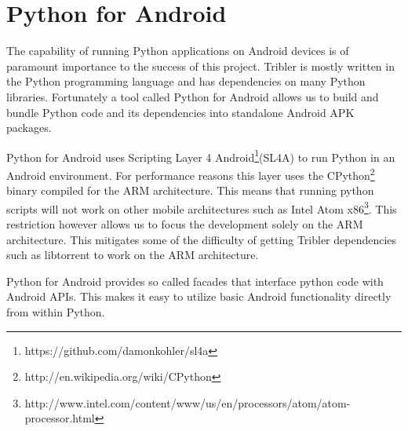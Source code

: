 \section{Python for Android}
	\label{sec:p4a}
	The capability of running Python applications on Android devices is of paramount importance to the success of this project. Tribler is mostly written in the Python programming language and has dependencies on many Python libraries. Fortunately a tool called Python for Android allows us to build and bundle Python code and its dependencies into standalone Android APK packages.

	Python for Android uses Scripting Layer 4 Android\footnote{https://github.com/damonkohler/sl4a}(SL4A) to run Python in an Android environment. For performance reasons this layer uses the CPython\footnote{http://en.wikipedia.org/wiki/CPython} binary compiled for the ARM architecture. This means that running python scripts will not work on other mobile architectures such as Intel Atom x86\footnote{http://www.intel.com/content/www/us/en/processors/atom/atom-processor.html}. This restriction however allows us to focus the development solely on the ARM architecture. This mitigates some of the difficulty of getting Tribler dependencies such as libtorrent to work on the ARM architecture.

	Python for Android provides so called facades that interface python code with Android APIs. This makes it easy to utilize basic Android functionality directly from within Python.
